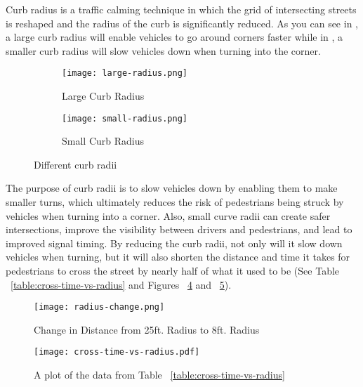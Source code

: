 Curb radius is a traffic calming technique in which the grid of intersecting streets is reshaped and the radius of the curb is significantly reduced. As you can see in , a large curb radius will enable vehicles to go around corners faster while in , a smaller curb radius will slow vehicles down when turning into the corner.

\begin{figure}[h]
\centering
\begin{subfigure}[b]{0.4\textwidth}
	\texttt{[image: large-radius.png]}
	\caption{Large Curb Radius}\label{fig:large-radius}
\end{subfigure}
\begin{subfigure}[b]{0.4\textwidth}
	\texttt{[image: small-radius.png]}
	\caption{Small Curb Radius}\label{fig:small-radius}
\end{subfigure}
\caption{Different curb radii}\label{fig:different-radii}
\end{figure}

        The purpose of curb radii is to slow vehicles down by enabling them to make smaller turns, which ultimately reduces the risk of pedestrians being struck by vehicles when turning into a corner. Also, small curve radii can create safer intersections, improve the visibility between drivers and pedestrians, and lead to improved signal timing. By reducing the curb radii, not only will it slow down vehicles when turning, but it will also shorten the distance and time it takes for pedestrians to cross the street by nearly half of what it used to be (See Table ~\ref{table:cross-time-vs-radius} and Figures ~\ref{fig:radius-change} and ~\ref{fig:cross-time-vs-radius}).
        
\begin{figure}[h]
\centering
	\texttt{[image: radius-change.png]}
	\caption[Effect of changing curb radius]{Change in Distance from 25ft. Radius to 8ft. Radius}\label{fig:radius-change}
\end{figure}



\begin{figure}[h]
\centering
	\texttt{[image: cross-time-vs-radius.pdf]}
	\caption[Plot of crossing times against curve radii]{A plot of the data from Table ~\ref{table:cross-time-vs-radius}}\label{fig:cross-time-vs-radius}
\end{figure}

